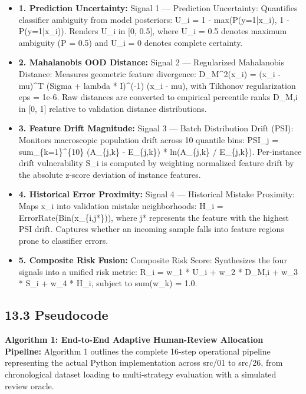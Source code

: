 \begin{itemize}
\item \textbf{1. Prediction Uncertainty:} Signal 1 --- Prediction Uncertainty: Quantifies classifier ambiguity from model posteriors: U\_i = 1 - max(P(y=1|x\_i), 1 - P(y=1|x\_i)). Renders U\_i in [0, 0.5], where U\_i = 0.5 denotes maximum ambiguity (P = 0.5) and U\_i = 0 denotes complete certainty.
\item \textbf{2. Mahalanobis OOD Distance:} Signal 2 --- Regularized Mahalanobis Distance: Measures geometric feature divergence: D\_M\textasciicircum{}2(x\_i) = (x\_i - mu)\textasciicircum{}T (Sigma + lambda * I)\textasciicircum{}(-1) (x\_i - mu), with Tikhonov regularization eps = 1e-6. Raw distances are converted to empirical percentile ranks D\_M,i in [0, 1] relative to validation distance distributions.
\item \textbf{3. Feature Drift Magnitude:} Signal 3 --- Batch Distribution Drift (PSI): Monitors macroscopic population drift across 10 quantile bins: PSI\_j = sum\_\{k=1\}\textasciicircum{}\{10\} (A\_\{j,k\} - E\_\{j,k\}) * ln(A\_\{j,k\} / E\_\{j,k\}). Per-instance drift vulnerability S\_i is computed by weighting normalized feature drift by the absolute z-score deviation of instance features.
\item \textbf{4. Historical Error Proximity:} Signal 4 --- Historical Mistake Proximity: Maps x\_i into validation mistake neighborhoods: H\_i = ErrorRate(Bin(x\_\{i,j*\})), where j* represents the feature with the highest PSI drift. Captures whether an incoming sample falls into feature regions prone to classifier errors.
\item \textbf{5. Composite Risk Fusion:} Composite Risk Score: Synthesizes the four signals into a unified risk metric: R\_i = w\_1 * U\_i + w\_2 * D\_M,i + w\_3 * S\_i + w\_4 * H\_i, subject to sum(w\_k) = 1.0.
\end{itemize}

\subsection{13.3 Pseudocode}

\textbf{Algorithm 1: End-to-End Adaptive Human-Review Allocation Pipeline:} Algorithm 1 outlines the complete 16-step operational pipeline representing the actual Python implementation across src/01 to src/26, from chronological dataset loading to multi-strategy evaluation with a simulated review oracle.

